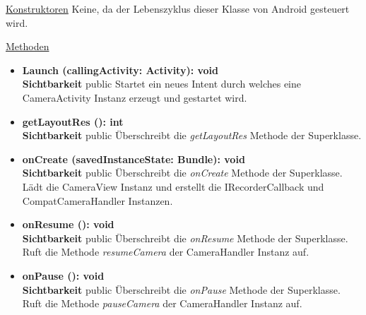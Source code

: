 \underline{Konstruktoren}\newline
\indent Keine, da der Lebenszyklus dieser Klasse von Android gesteuert wird.\newline

\underline{Methoden}
\begin{itemize}
\itemsep0pt

\item \textbf{Launch (callingActivity: Activity): void}\hfill\\
\textbf{Sichtbarkeit} public\newline
Startet ein neues Intent durch welches eine CameraActivity Instanz erzeugt und gestartet wird.

\item \textbf{getLayoutRes (): int}\hfill\\
\textbf{Sichtbarkeit} public\newline
Überschreibt die \textit{getLayoutRes} Methode der Superklasse.

\item \textbf{onCreate (savedInstanceState: Bundle): void}\hfill\\
\textbf{Sichtbarkeit} public\newline
Überschreibt die \textit{onCreate} Methode der Superklasse. Lädt die CameraView Instanz und erstellt die IRecorderCallback und CompatCameraHandler Instanzen.

\item \textbf{onResume (): void}\hfill\\
\textbf{Sichtbarkeit} public\newline
Überschreibt die \textit{onResume} Methode der Superklasse. Ruft die Methode \textit{resumeCamera} der CameraHandler Instanz auf.

\item \textbf{onPause (): void}\hfill\\
\textbf{Sichtbarkeit} public\newline
Überschreibt die \textit{onPause} Methode der Superklasse. Ruft die Methode \textit{pauseCamera} der CameraHandler Instanz auf.

\end{itemize}